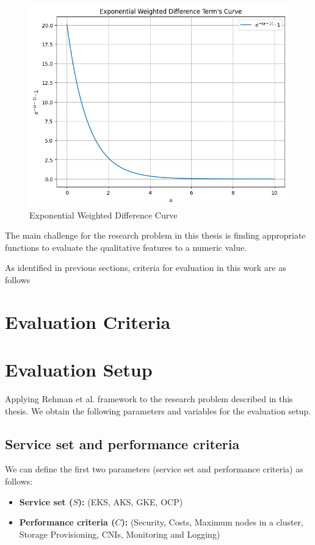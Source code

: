\begin{figure}
    \centering
    \includegraphics[width=0.75\linewidth]{resources/example exponential function.png}
    \caption{Exponential Weighted Difference Curve}
    \label{fig:example-exp-func-graph}
\end{figure}

The main challenge for the research problem in this thesis is finding
appropriate functions to evaluate the qualitative features to a numeric
value.

As identified in previous sections, criteria for evaluation in this work
are as follows

\section{Evaluation Criteria}\label{evaluation-criteria}


\section{Evaluation Setup}\label{evaluation-setup}

Applying Rehman et al. framework to the research problem described in this thesis. We obtain the following parameters and variables for the evaluation setup.

\subsection{Service set and performance
criteria}\label{service-set-and-performance-criteria}

We can define the first two parameters (service set and performance criteria) as follows:

\begin{itemize}
\tightlist
\item
  \textbf{Service set (\(S\)):} (EKS, AKS, GKE, OCP)
\item
  \textbf{Performance criteria (\(C\)):} (Security, Costs, Maximum nodes
  in a cluster, Storage Provisioning, CNIs, Monitoring and Logging)
\end{itemize}

